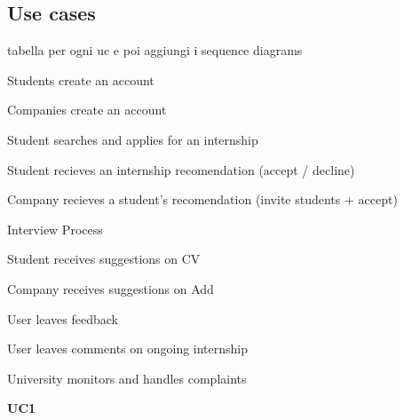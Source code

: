 \subsection{Use cases}
tabella per ogni uc e poi aggiungi i sequence diagrams
\item Students create an account
\item Companies create an account
\item Student searches and applies for an internship
\item Student recieves an internship recomendation (accept / decline)
\item Company recieves a student’s recomendation (invite students + accept)
\item Interview Process
\item Student receives suggestions on CV
\item Company receives suggestions on Add
\item User leaves feedback
\item User leaves comments on ongoing internship
\item University monitors and handles complaints

\textbf{UC1}


